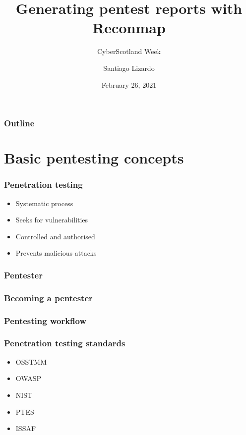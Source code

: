 \documentclass{beamer}
\title{Generating pentest reports with Reconmap}
\subtitle{CyberScotland Week}
\author{Santiago Lizardo}
\date{February 26, 2021}
\begin{document}
\begin{frame}
    
    \titlepage
\end{frame}

\begin{frame}
    \frametitle{Outline}

    \tableofcontents
\end{frame}

\section{Basic pentesting concepts}

\begin{frame}
    \frametitle{Penetration testing}


	\begin{itemize}
		\item Systematic process
		\item Seeks for vulnerabilities
		\item Controlled and authorised
		\item Prevents malicious attacks
	\end{itemize}	    
\end{frame}

\begin{frame}
    \frametitle{Pentester}

    \note[item]{
    }
\end{frame}

\begin{frame}
    \frametitle{Becoming a pentester}

    \note[item]{
    }
\end{frame}

\begin{frame}
    \frametitle{Pentesting workflow}

    \note[item]{
    }
\end{frame}

\begin{frame}
    \frametitle{Penetration testing standards}

    \note[item]{
    }
    
	\begin{itemize}
		\item OSSTMM
		\item OWASP
		\item NIST
		\item PTES
		\item ISSAF		
	\end{itemize}	    
\end{frame}
\end{document}
